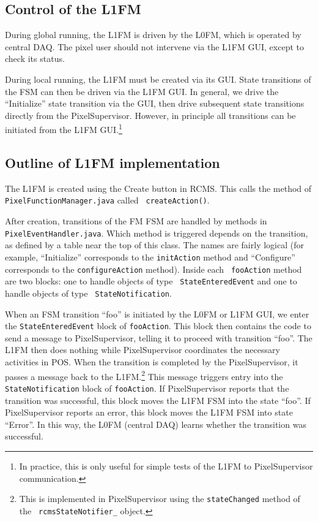\subsection{Control of the L1FM}

During global running, the L1FM is driven by the L0FM, which is
operated by central DAQ. The pixel user should not intervene via the
L1FM GUI, except to check its status.

During local running, the L1FM must be created via its GUI. State
transitions of the FSM can then be driven via the L1FM GUI. In
general, we drive the ``Initialize'' state transition via the GUI,
then drive subsequent state transitions directly from the
PixelSupervisor. However, in principle all transitions can be
initiated from the L1FM GUI.\footnote{In practice, this is only useful for simple tests of the L1FM to PixelSupervisor communication.}

\subsection{Outline of L1FM implementation}

The L1FM is created using the Create button in RCMS. This calls the
method of {\tt PixelFunctionManager.java} called {\tt
createAction()}.

After creation, transitions of the FM FSM are handled
by methods in {\tt PixelEventHandler.java}. Which method is triggered
depends on the transition, as defined by a table near the top of this
class. The names are fairly logical (for example, ``Initialize''
corresponds to the {\tt initAction} method and ``Configure''
corresponds to the {\tt configureAction} method). Inside each {\tt
fooAction} method are two blocks: one to handle objects of type {\tt
StateEnteredEvent} and one to handle objects of type {\tt
StateNotification}. 

When an FSM transition ``foo'' is initiated by the L0FM or L1FM GUI,
we enter the {\tt StateEnteredEvent} block of {\tt fooAction}. This
block then contains the code to send a message to PixelSupervisor,
telling it to proceed with transition ``foo''. The L1FM then does
nothing while PixelSupervisor coordinates the necessary activities in
POS. When the transition is completed by the PixelSupervisor, it
passes a message back to the L1FM.\footnote{This is implemented in
PixelSupervisor using the {\tt stateChanged} method of the {\tt
rcmsStateNotifier\_} object.} This message triggers entry into the {\tt
StateNotification} block of {\tt fooAction}. If PixelSupervisor
reports that the transition was successful, this block moves the L1FM
FSM into the state ``foo''. If PixelSupervisor reports an error, this
block moves the L1FM FSM into state ``Error''. In this way, the L0FM
(central DAQ) learns whether the transition was successful.


